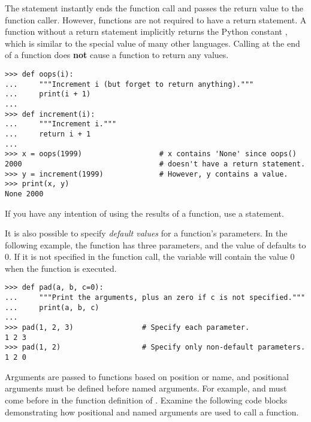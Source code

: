 \begin{warn} %
The  statement instantly ends the function call and passes the return value to the function caller.
However, functions are not required to have a return statement.
A function without a return statement implicitly returns the Python constant , which is similar to the special value  of many other languages.
Calling  at the end of a function does \textbf{not} cause a function to return any values.

\begin{lstlisting}
>>> def oops(i):
...     """Increment i (but forget to return anything)."""
...     print(i + 1)
...
>>> def increment(i):
...     """Increment i."""
...     return i + 1
...
>>> x = oops(1999)                  # x contains 'None' since oops()
2000                                # doesn't have a return statement.
>>> y = increment(1999)             # However, y contains a value.
>>> print(x, y)
None 2000
\end{lstlisting}
%
If you have any intention of using the results of a function, use a  statement.
\end{warn}

It is also possible to specify \emph{default values} for a function's parameters.
In the following example, the function  has three parameters, and the value of  defaults to 0.
If it is not specified in the function call, the variable  will contain the value 0 when the function is executed.

\begin{lstlisting}
>>> def pad(a, b, c=0):
...     """Print the arguments, plus an zero if c is not specified."""
...     print(a, b, c)
...
>>> pad(1, 2, 3)                # Specify each parameter.
1 2 3
>>> pad(1, 2)                   # Specify only non-default parameters.
1 2 0
\end{lstlisting}

Arguments are passed to functions based on position or name, and positional arguments must be defined before named arguments.
For example,  and  must come before  in the function definition of .
Examine the following code blocks demonstrating how positional and named arguments are used to call a function.

